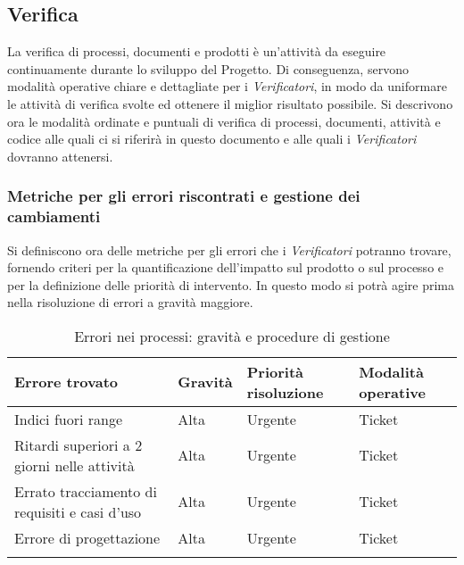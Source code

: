 {	\subsection{Verifica}
La verifica di processi, documenti e prodotti è un'attività da eseguire continuamente durante lo sviluppo del Progetto. Di conseguenza, servono modalità operative chiare
e dettagliate per i \emph{Verificatori}, in modo da uniformare le attività di verifica svolte ed ottenere il miglior risultato possibile. Si descrivono ora le modalità ordinate e puntuali di verifica di processi, documenti, attività e codice alle quali ci si riferirà in questo documento e alle quali i \emph{Verificatori} dovranno attenersi.

	\subsubsection{Metriche per gli errori riscontrati e gestione dei cambiamenti}
Si definiscono ora delle metriche per gli errori che i \emph{Verificatori} potranno trovare, fornendo criteri per la quantificazione dell’impatto sul prodotto o sul processo e per la definizione delle priorità di intervento. In questo modo si potrà agire prima nella risoluzione di errori a gravità maggiore.


\begin{longtable}[c]{|>{\centering\arraybackslash}m{6cm} | >{\centering\arraybackslash}m{3cm} | >{\centering\arraybackslash}m{3cm} | >{\centering\arraybackslash}m{3cm} |}

 \hline
 \textbf{Errore trovato} & \textbf{Gravità} & \textbf{Priorità risoluzione} & \textbf{Modalità operative}\\
 \hline
 Indici fuori range & Alta & Urgente & Ticket\\
 \hline
 Ritardi superiori a 2 giorni nelle attività & Alta & Urgente & Ticket\\
 \hline
 Errato tracciamento di requisiti e casi d'uso & Alta & Urgente & Ticket\\ 
 \hline
 Errore di progettazione & Alta & Urgente & Ticket\\
 \hline
		\caption{Errori nei processi: gravità e procedure di gestione \label{tab:ErroriProcessi}}\\
\end{longtable}


\begin{longtable}[c]{|>{\centering\arraybackslash}m{6cm} | >{\centering\arraybackslash}m{3cm} | >{\centering\arraybackslash}m{3cm} | >{\centering\arraybackslash}m{3cm} |}
 

\end{longtable}}
